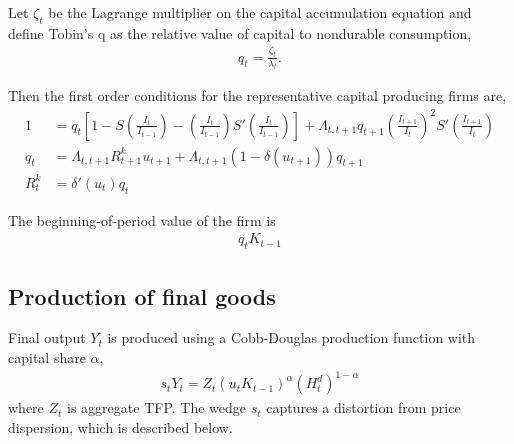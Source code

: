 \documentclass[11pt]{article}
\begin{document}
Let $\zeta_t$ be the Lagrange multiplier on the capital accumulation equation and define Tobin's q as the relative value of capital to nondurable consumption,
\begin{align*}
	q_t=\frac{\zeta_t}{\lambda_t}.
\end{align*}

Then the first order conditions for the representative capital producing firms are,
\begin{align*}
	1 &= q_t \left[1-S\left(\frac{I_t}{I_{t-1}}\right) -  \left(\frac{I_t}{I_{t-1}}\right) S'\left(\frac{I_t}{I_{t-1}}\right)\right] + \Lambda_{t,t+1} q_{t+1} \left(\frac{I_{t+1}}{I_{t}}\right)^2 S'\left(\frac{I_{t+1}}{I_{t}}\right) \\
	q_t &= \Lambda_{t,t+1} R_{t+1}^k u_{t+1} +  \Lambda_{t,t+1} (1-\delta(u_{t+1})) q_{t+1} \\
	 R_{t}^k &=\delta'(u_{t})q_t
\end{align*}

The beginning-of-period value of the firm is
\begin{align*}
	q_t K_{t-1}
\end{align*}


\subsection{Production of final goods}

Final output $Y_t$ is produced using a Cobb-Douglas production function with capital share $\alpha$,
\begin{align*}
	s_t Y_t = Z_t (u_t K_{t-1})^{\alpha} (H_t^d)^{1-\alpha}
\end{align*}
where $Z_t$ is aggregate TFP. The wedge $s_t$ captures a distortion from price dispersion, which is described below.
\end{document}
